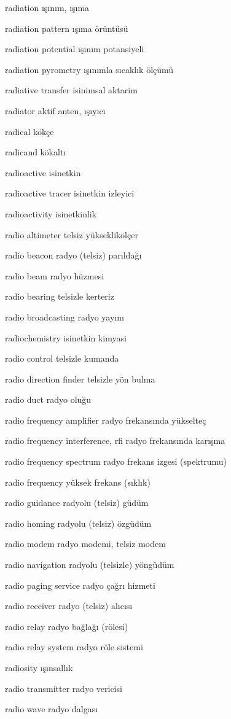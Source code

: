 \documentclass[12pt,fleqn]{article}\usepackage{../../common}
\begin{document}
radiation ışınım, ışıma

radiation pattern ışıma örüntüsü

radiation potential ışınım potansiyeli

radiation pyrometry ışınımla sıcaklık ölçümü

radiative transfer isinimsal aktarim

radiator aktif anten, ışıyıcı

radical kökçe

radicand kökaltı

radioactive isinetkin

radioactive tracer isinetkin izleyici

radioactivity isinetkinlik

radio altimeter telsiz yükseklikölçer

radio beacon radyo (telsiz) parıldağı

radio beam radyo hüzmesi

radio bearing telsizle kerteriz

radio broadcasting radyo yayını

radiochemistry isinetkin kimyasi

radio control telsizle kumanda

radio direction finder telsizle yön bulma

radio duct radyo oluğu

radio frequency amplifier radyo frekansında yükselteç

radio frequency interference, rfi radyo frekansında karışma

radio frequency spectrum radyo frekans izgesi (spektrumu)

radio frequency yüksek frekans (sıklık)

radio guidance radyolu (telsiz) güdüm

radio homing radyolu (telsiz) özgüdüm

radio modem radyo modemi, telsiz modem

radio navigation radyolu (telsizle) yöngüdüm

radio paging service radyo çağrı hizmeti

radio receiver radyo (telsiz) alıcısı

radio relay radyo bağlağı (rölesi)

radio relay system radyo röle sistemi

radiosity ışınsallık

radio transmitter radyo vericisi

radio wave radyo dalgası
\end{document}
